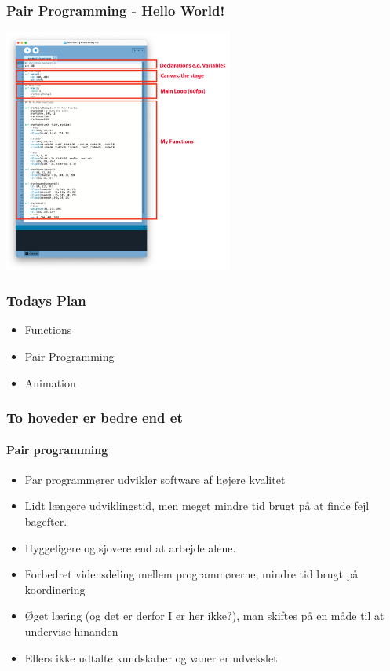 \documentclass[10pt]{beamer}
\begin{document}
\begin{frame}
   \frametitle{Pair Programming - Hello World!}
   	 \includegraphics[height=8cm]{images/process}
\end{frame}



\begin{frame}
\frametitle{Todays Plan}
\begin{itemize}
\item Functions
\item Pair Programming
\item Animation
\end{itemize}
\end{frame}

\begin{frame}
  \frametitle{To hoveder er bedre end et}
  \framesubtitle{Pair programming}

  \begin{itemize}
  \item Par programmører udvikler software af højere kvalitet
  \item Lidt længere udviklingstid, men meget mindre tid brugt på at
    finde fejl bagefter.
  \item Hyggeligere og sjovere end at arbejde alene.
  \item Forbedret vidensdeling mellem programmørerne, mindre tid brugt
    på koordinering %
  \item Øget læring (og det er derfor I er her ikke?), man skiftes på
    en måde til at undervise hinanden
  \item Ellers ikke udtalte kundskaber og vaner er udvekslet
  \end{itemize}
  

\end{frame}
\end{document}
